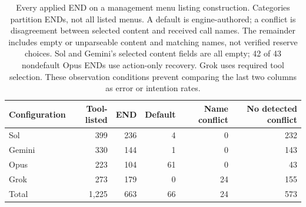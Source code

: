 \begin{table}[t]
\centering\small
\begin{tabular}{lrrrrr}\toprule
Configuration & Tool-listed & END & Default & Name conflict & No detected conflict\\\midrule
Sol & 399 & 236 & 4 & 0 & 232 \\
Gemini & 330 & 144 & 1 & 0 & 143 \\
Opus & 223 & 104 & 61 & 0 & 43 \\
Grok & 273 & 179 & 0 & 24 & 155 \\
\midrule Total & 1,225 & 663 & 66 & 24 & 573\\\bottomrule
\end{tabular}
\caption{Every applied END on a management menu listing construction. Categories partition ENDs, not all listed menus. A default is engine-authored; a conflict is disagreement between selected content and received call names. The remainder includes empty or unparseable content and matching names, not verified reserve choices. Sol and Gemini's selected content fields are all empty; 42 of 43 nondefault Opus ENDs use action-only recovery. Grok uses required tool selection. These observation conditions prevent comparing the last two columns as error or intention rates.}
\label{tab:end-provenance}
\end{table}
